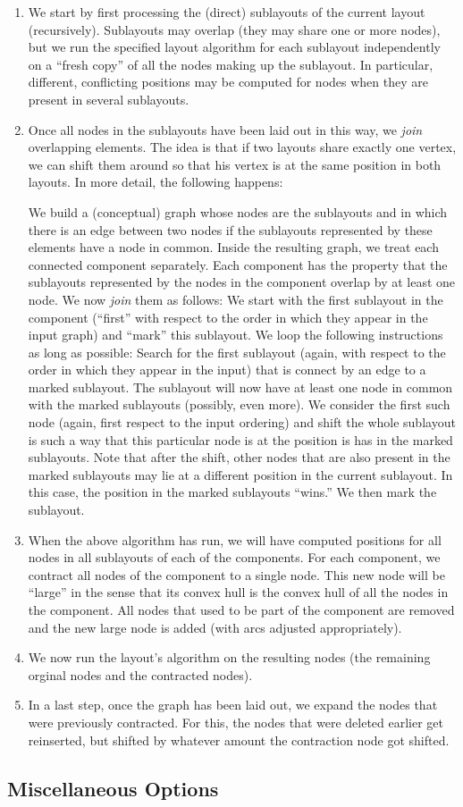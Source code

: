 \begin{enumerate} 
\item We start by first processing the (direct) sublayouts of the
  current layout (recursively). Sublayouts may overlap (they may share
  one or more nodes), but we run the specified layout algorithm for
  each sublayout independently on a ``fresh copy'' of all the nodes
  making up the sublayout. In particular, different, conflicting
  positions may be computed for nodes when they are present in several
  sublayouts. 
\item Once all nodes in the sublayouts have been laid out in this way,
  we \emph{join} overlapping elements. The idea is that if two layouts
  share exactly one vertex, we can shift them around so that his
  vertex is at the same position in both layouts. In more detail, the
  following happens:

  We build a (conceptual) graph whose nodes are the sublayouts and in
  which there is an edge between two nodes if the sublayouts
  represented by these elements have a node in common.
  Inside the resulting graph, we treat each connected component
  separately. Each component has the property that the sublayouts
  represented by the nodes in the component overlap by at least one
  node. We now \emph{join} them as follows: We start with the first
  sublayout in the component (``first'' with respect to the order in
  which they appear in the input graph) and ``mark'' this
  sublayout. We loop the following instructions as long as possible:
  Search for the first sublayout (again, with respect to the order in
  which they appear in the input) that is connect by an edge to a
  marked sublayout. The sublayout will now have at least one node in
  common with the marked sublayouts (possibly, even more). We
  consider the first such node (again, first respect to the input
  ordering) and shift the whole sublayout is such a way that this
  particular node is at the position is has in the marked
  sublayouts. Note that after the shift, other nodes that are also
  present in the marked sublayouts may lie at a different position in
  the current sublayout. In this case, the position in the marked
  sublayouts ``wins.'' We then mark the sublayout.
\item When the above algorithm has run, we will have computed
  positions for all nodes in all sublayouts of each of the
  components. For each component, we contract all
  nodes of the component to a single node. This new 
  node will be ``large'' in the sense that its convex hull is the
  convex hull of all the nodes in the component. All nodes that used
  to be part of the component are removed and the new large node is
  added (with arcs adjusted appropriately). 
\item We now run the layout's algorithm on the resulting nodes
  (the remaining orginal nodes and the contracted nodes).
\item In a last step, once the graph has been laid out, we expand the
  nodes that were previously contracted. For this, the 
  nodes that were deleted earlier get reinserted, but shifted by
  whatever amount the contraction node got shifted.
\end{enumerate}


\subsection{Miscellaneous Options}


\endinput

